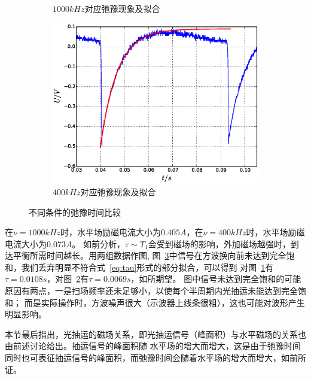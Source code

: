 \documentclass[11pt,a4paper]{article}
\begin{document}
\begin{spacing}{1.3}
\begin{CJK*}{UTF8}{gbsn}
\begin{figure}[h!]
\begin{subfigure}{0.50\textwidth}
\caption{$1000kHz$对应弛豫现象及拟合}
\label{fig:1000}
\end{subfigure}
\begin{subfigure}{0.50\textwidth}
\centering
\includegraphics[width=\linewidth]{1112c}
\caption{$400kHz$对应弛豫现象及拟合}
\label{fig:400}
\end{subfigure}
\caption{不同条件的弛豫时间比较}\label{fig:comt}
\end{figure}
在$\nu=1000kHz$时，水平场励磁电流大小为$0.405A$，在$\nu=400kHz$时，水平场励磁电流大小为$0.073A$。
如前分析，$\tau\sim T_1$会受到磁场的影响，外加磁场越强时，到达平衡所需时间越长。用两组数据作图,
图~\ref{fig:comt}中信号在方波换向前未达到完全饱和，我们丢弃明显不符合式~\eqref{eq:tau}形式的部分拟合，可以得到
对图~\ref{fig:1000}有$\tau = 0.0108s$，对图~\ref{fig:400}有$\tau = 0.0069s$，如所期望。
图中信号未达到完全饱和的可能原因有两点，一是扫场频率还未足够小，以使每个半周期内光抽运未能达到完全饱和；
而是实际操作时，方波噪声很大（示波器上线条很粗），这也可能对波形产生明显影响。\par 
本节最后指出，光抽运的磁场关系，即光抽运信号（峰面积）与水平磁场的关系也由前述讨论给出。抽运信号的峰面积随
水平场的增大而增大，这是由于弛豫时间同时也可表征抽运信号的峰面积，而弛豫时间会随着水平场的增大而增大，如前所证。


\end{CJK*}
\end{spacing}
\end{document}
